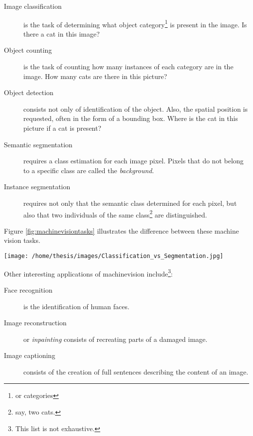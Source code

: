 \begin{description}
    \item[Image classification] is the task of determining what object category\footnote{or categories} is present in the image. Is there a cat in this image?
    \item[Object counting] is the task of counting how many instances of each category are in the image. How many cats are there in this picture? 
    \item[Object detection] consists not only of identification of the object. Also, the spatial position is requested, often in the form of a bounding box. Where is the cat in this picture if a cat is present?
    \item[Semantic segmentation] requires a class estimation for each image pixel. Pixels that do not belong to a specific class are called the \textit{background}.
    \item[Instance segmentation] requires not only that the semantic class determined for each pixel, but also that two individuals of the same class\footnote{say, two cats.} are distinguished.   
\end{description}

Figure \ref{fig:machinevisiontasks} illustrates the difference between these machine vision tasks. 

\begin{SCfigure}[][h!]
    \centering
    \texttt{[image: /home/thesis/images/Classification\_vs\_Segmentation.jpg]}
    \caption{Illustration to compare different Machine vision tasks \cite{SemTorch76:online}. 
    Object detection means that the location of several objects is estimated by the model. This is indicated by the \textit{bounding boxes}.
    Segmentation of an image is classifying each pixel in the correct class or assigning it to the \textit{background} class.
    Semantic segmentation makes no difference between different instances of the same semantic class, instance segmentation does.
    \label{fig:machinevisiontasks}}
\end{SCfigure}

Other interesting applications of \gls{machinevision} include\footnote{This list is not exhaustive.}:
\begin{description}
    \item[Face recognition] is the identification of human faces. 
    \item[Image reconstruction] or \textit{inpainting} consists of recreating parts of a damaged image.
    \item[Image captioning] consists of the creation of full sentences describing the content of an image.    
\end{description}

